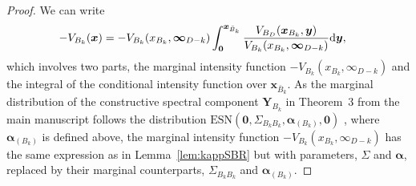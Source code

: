 \documentclass[12pt]{article}
\begin{document}
\begin{proof}
We can write 
\begin{align*}
-V_{B_k}(\bm x) 
&=-V_{B_k}(x_{B_k},\bm\infty_{D-k})\int_{\bm 0}^{\bm x_{\bar B_k}}\frac{V_{B_D}(\bm x_{B_k},\bm y)}{V_{B_k}(x_{B_k},\bm\infty_{D-k})} \text d \bm y,
\end{align*}
which involves two parts, the marginal intensity function $-V_{B_k}(x_{B_k},\infty_{D-k})$ and the integral of the conditional intensity function over $\bm x_{\bar B_k}$. As the marginal distribution of the constructive spectral component $\bm Y_{B_k}$ in Theorem~3 from the main manuscript follows the distribution $\text{ESN}(\bm 0,\Sigma_{B_kB_k},\bm\alpha_{(B_k)},\bm 0)$ \citep[Chapter 5.1.4]{Azzalini:2013}, where $\bm\alpha_{(B_k)}$ is defined above, the marginal intensity function $-V_{B_k}(x_{B_k},\infty_{D-k})$ has the same expression as in Lemma~\ref{lem:kappSBR} but with parameters, $\Sigma$ and $\bm\alpha$, replaced by their marginal counterparts, $\Sigma_{B_kB_k}$ and $\bm\alpha_{(B_k)}$. 


\end{proof}
\end{document}
